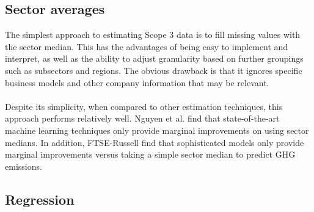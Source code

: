 \documentclass[12pt,twoside]{report}
\begin{document}
\subsection{Sector averages}

The simplest approach to estimating Scope 3 data is to fill missing values with the sector median. This has the advantages of being easy to implement and interpret, as well as the ability to adjust granularity based on further groupings such as subsectors and regions. The obvious drawback is that it ignores specific business models and other company information that may be relevant. 
\\ \\
Despite its simplicity, when compared to other estimation techniques, this approach performs relatively well. Nguyen et al. \cite{Nguyenetal2023} find that state-of-the-art machine learning techniques only provide marginal improvements on using sector medians. In addition, FTSE-Russell \cite{FTSERussell2022} find that sophisticated models only provide marginal improvements versus taking a simple sector median to predict GHG emissions. 

\subsection{Regression}
\end{document}
